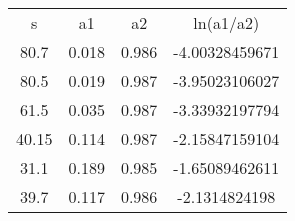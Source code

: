 \begin{table}
\begin{tabular}{cccc}
s & a1 & a2 & ln(a1/a2) \\
80.7 & 0.018 & 0.986 & -4.00328459671 \\
80.5 & 0.019 & 0.987 & -3.95023106027 \\
61.5 & 0.035 & 0.987 & -3.33932197794 \\
40.15 & 0.114 & 0.987 & -2.15847159104 \\
31.1 & 0.189 & 0.985 & -1.65089462611 \\
39.7 & 0.117 & 0.986 & -2.1314824198 \\
\end{tabular}
\end{table}
